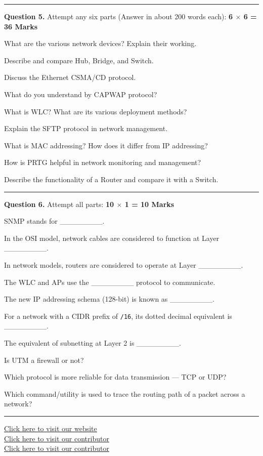 \documentclass[11pt,a4paper]{article}
\begin{document}
\bigskip


\rule{\linewidth}{0.4pt}\smallskip




\noindent   \textbf{Question 5.} Attempt any six parts (Answer in about 200 words each): \hfill   \textbf{6 $ \times$ 6 = 36 Marks}

\begin{parts}
  \item What are the various network devices? Explain their working.
  \item Describe and compare Hub, Bridge, and Switch.
  \item Discuss the Ethernet CSMA/CD protocol.
  \item What do you understand by CAPWAP protocol?
  \item What is WLC? What are its various deployment methods?
  \item Explain the SFTP protocol in network management.
  \item What is MAC addressing? How does it differ from IP addressing?
  \item How is PRTG helpful in network monitoring and management?
  \item Describe the functionality of a Router and compare it with a Switch.
\end{parts}

\bigskip


\rule{\linewidth}{0.4pt}\smallskip




\noindent   \textbf{Question 6.} Attempt all parts: \hfill   \textbf{10 $ \times$ 1 = 10 Marks}

\begin{parts}
  \item SNMP stands for \_\_\_\_\_\_\_\_.
  \item In the OSI model, network cables are considered to function at Layer \_\_\_\_\_\_\_\_.
  \item In network models, routers are considered to operate at Layer \_\_\_\_\_\_\_\_.
  \item The WLC and APs use the \_\_\_\_\_\_\_\_ protocol to communicate.
  \item The new IP addressing schema (128-bit) is known as \_\_\_\_\_\_\_\_.
  \item For a network with a CIDR prefix of   \texttt{/16}, its dotted decimal equivalent is \_\_\_\_\_\_\_\_.
  \item The equivalent of subnetting at Layer 2 is \_\_\_\_\_\_\_\_.
  \item Is UTM a firewall or not?
  \item Which protocol is more reliable for data transmission --- TCP or UDP?
  \item Which command/utility is used to trace the routing path of a packet across a network?
\end{parts}

\vfill
\rule{\linewidth}{0.4pt}

\begin{center}\small
\href{https://bhu-exam.vercel.app/}{Click here to visit our website}\\[4pt]\href{https://me-aryan.vercel.app/}{Click here to visit our contributor}\\[4pt]\href{https://quashan-me.vercel.app/}{Click here to visit our contributor}
\end{center}
\end{document}
